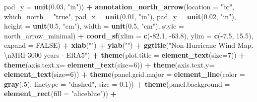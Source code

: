 \documentclass[12pt,twoside]{reedthesis}
\newenvironment{Shaded}{\begin{snugshade}}{\end{snugshade}}
\newcommand{\CharTok}[1]{\textcolor[rgb]{0.31,0.60,0.02}{#1}}
\newcommand{\DataTypeTok}[1]{\textcolor[rgb]{0.13,0.29,0.53}{#1}}
\newcommand{\DecValTok}[1]{\textcolor[rgb]{0.00,0.00,0.81}{#1}}
\newcommand{\FloatTok}[1]{\textcolor[rgb]{0.00,0.00,0.81}{#1}}
\newcommand{\KeywordTok}[1]{\textcolor[rgb]{0.13,0.29,0.53}{\textbf{#1}}}
\newcommand{\NormalTok}[1]{#1}
\newcommand{\OperatorTok}[1]{\textcolor[rgb]{0.81,0.36,0.00}{\textbf{#1}}}
\newcommand{\OtherTok}[1]{\textcolor[rgb]{0.56,0.35,0.01}{#1}}
\newcommand{\StringTok}[1]{\textcolor[rgb]{0.31,0.60,0.02}{#1}}
\begin{document}
\begin{Shaded}
\begin{Highlighting}[]
   \DataTypeTok{pad_y =} \KeywordTok{unit}\NormalTok{(}\FloatTok{0.03}\NormalTok{, }\StringTok{"in"}\NormalTok{)) }\OperatorTok{+}\StringTok{ }
\StringTok{  }\KeywordTok{annotation_north_arrow}\NormalTok{(}\DataTypeTok{location =} \StringTok{"br"}\NormalTok{, }\DataTypeTok{which_north =} \StringTok{"true"}\NormalTok{, }\DataTypeTok{pad_x =} \KeywordTok{unit}\NormalTok{(}\FloatTok{0.01}\NormalTok{, }\StringTok{"in"}\NormalTok{), }\DataTypeTok{pad_y =} \KeywordTok{unit}\NormalTok{(}\FloatTok{0.02}\NormalTok{, }\StringTok{"in"}\NormalTok{), }\DataTypeTok{height =} \KeywordTok{unit}\NormalTok{(}\FloatTok{0.5}\NormalTok{, }\StringTok{"cm"}\NormalTok{), }
   \DataTypeTok{width =} \KeywordTok{unit}\NormalTok{(}\FloatTok{0.5}\NormalTok{, }\StringTok{"cm"}\NormalTok{), }\DataTypeTok{style =}\NormalTok{ north_arrow_minimal) }\OperatorTok{+}
\StringTok{  }\KeywordTok{coord_sf}\NormalTok{(}\DataTypeTok{xlim =} \KeywordTok{c}\NormalTok{(}\OperatorTok{-}\FloatTok{82.1}\NormalTok{, }\FloatTok{-63.8}\NormalTok{), }\DataTypeTok{ylim =} \KeywordTok{c}\NormalTok{(}\OperatorTok{-}\FloatTok{7.5}\NormalTok{, }\FloatTok{15.5}\NormalTok{), }\DataTypeTok{expand =} \OtherTok{FALSE}\NormalTok{) }\OperatorTok{+}
\StringTok{  }\KeywordTok{xlab}\NormalTok{(}\StringTok{""}\NormalTok{) }\OperatorTok{+}\StringTok{ }
\StringTok{  }\KeywordTok{ylab}\NormalTok{(}\StringTok{""}\NormalTok{) }\OperatorTok{+}\StringTok{ }
\StringTok{  }\KeywordTok{ggtitle}\NormalTok{(}\StringTok{"Non-Hurricane Wind Map. }\CharTok{\textbackslash{}n}\StringTok{MRI-3000 years - ERA5"}\NormalTok{) }\OperatorTok{+}\StringTok{ }
\StringTok{  }\KeywordTok{theme}\NormalTok{(}\DataTypeTok{plot.title =} \KeywordTok{element_text}\NormalTok{(}\DataTypeTok{size=}\DecValTok{7}\NormalTok{)) }\OperatorTok{+}
\StringTok{  }\KeywordTok{theme}\NormalTok{(}\DataTypeTok{axis.text.x=} \KeywordTok{element_text}\NormalTok{(}\DataTypeTok{size=}\DecValTok{6}\NormalTok{)) }\OperatorTok{+}\StringTok{ }
\StringTok{  }\KeywordTok{theme}\NormalTok{(}\DataTypeTok{axis.text.y=} \KeywordTok{element_text}\NormalTok{(}\DataTypeTok{size=}\DecValTok{6}\NormalTok{)) }\OperatorTok{+}
\StringTok{  }\KeywordTok{theme}\NormalTok{(}\DataTypeTok{panel.grid.major =} \KeywordTok{element_line}\NormalTok{(}\DataTypeTok{color =} \KeywordTok{gray}\NormalTok{(.}\DecValTok{5}\NormalTok{), }\DataTypeTok{linetype =} \StringTok{"dashed"}\NormalTok{, }\DataTypeTok{size =} \FloatTok{0.1}\NormalTok{)) }\OperatorTok{+}
\StringTok{  }\KeywordTok{theme}\NormalTok{(}\DataTypeTok{panel.background =} \KeywordTok{element_rect}\NormalTok{(}\DataTypeTok{fill =} \StringTok{"aliceblue"}\NormalTok{)) }\OperatorTok{+}

\end{Highlighting}
\end{Shaded}
\end{document}

